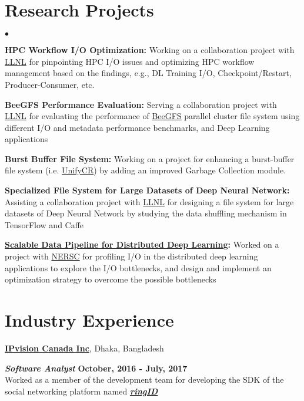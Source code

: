 \documentclass[margin,line]{res}
\newenvironment{list2}{
  \begin{list}{$\bullet$}{%
      \setlength{\itemsep}{0in}
      \setlength{\parsep}{0in} \setlength{\parskip}{0in}
      \setlength{\topsep}{0in} \setlength{\partopsep}{0in} 
      \setlength{\leftmargin}{0.2in}}}{\end{list}}
\begin{document}
\begin{resume}
\section{\sc Research Projects}
\begin{list2}
\item {\bf HPC Workflow I/O Optimization:} Working on a collaboration project with \href{https://www.llnl.gov/}{LLNL} for pinpointing HPC I/O issues and optimizing HPC workflow management based on the findings, e.g., DL Training I/O, Checkpoint/Restart, Producer-Consumer, etc.
\item {\bf BeeGFS Performance Evaluation:} Serving a collaboration project with \href{https://www.llnl.gov/}{LLNL} for evaluating the performance of \href{https://www.beegfs.io/content/}{BeeGFS} parallel cluster file system using different I/O and metadata performance benchmarks, and Deep Learning applications
\item {\bf Burst Buffer File System:} Working on a project for enhancing a burst-buffer file system (i.e. \href{https://github.com/LLNL/UnifyCR}{UnifyCR}) by adding an improved Garbage Collection module.
\item {\bf Specialized File System for Large Datasets of Deep Neural Network:} Assisting a collaboration project with \href{https://www.llnl.gov/}{LLNL} for designing a file system for large datasets of Deep Neural Network by studying the data shuffling mechanism in TensorFlow and Caffe
\item {\bf \href{https://github.com/NERSC/DL-Parallel-IO}{Scalable Data Pipeline for Distributed Deep Learning}:} Worked on a project with \href{http://www.nersc.gov/}{NERSC} for profiling I/O in the distributed deep learning applications to explore the I/O bottlenecks, and design and implement an optimization strategy to overcome the possible bottlenecks
\end{list2}

\vspace*{-.1in}

\section{\sc Industry Experience}
{\bf \href{http://www.ipvision.ca/}{IPvision Canada Inc}}, Dhaka, Bangladesh

\vspace{-.4cm}
\textbf{{\em Software Analyst}} \hfill {\bf October, 2016 - July, 2017}\\
Worked as a member of the development team for developing the SDK of the social networking platform named \textbf{\textit{\href{https://www.ringid.com/}{ringID}}}


\end{resume}
\end{document}
